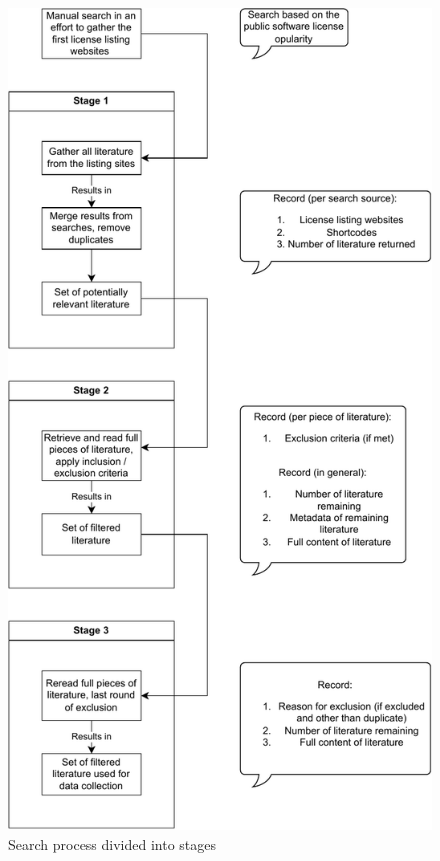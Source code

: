\begin{figure}
	\centering
	\includegraphics[scale=0.67]{figures/search-process.pdf}
	\caption{Search process divided into stages}
	\label{fig:search-process}
\end{figure}

